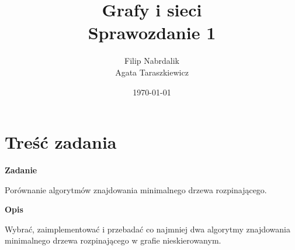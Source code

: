 \documentclass[a4paper, 10pt]{article}
\title{{\bf {Grafy i sieci}} \\ {\large Sprawozdanie 1}}
\date{\today}
\author{Filip Nabrdalik \\Agata Taraszkiewicz}
\begin{document}

\null  %
\nointerlineskip  %
\vfill
\let\snewpage \newpage
\let\newpage \relax
\maketitle 
\let \newpage \snewpage
\vfill
\break %

\tableofcontents

\newpage






\section{Treść zadania}

{\bf{Zadanie}}

Porównanie algorytmów znajdowania minimalnego drzewa rozpinającego.

{\bf{Opis}}

Wybrać, zaimplementować i przebadać co najmniej dwa algorytmy znajdowania minimalnego drzewa rozpinającego w grafie nieskierowanym. 



\section{}




\section{}


\section{}
\subsection{}



\nocite{*}

\end{document}
